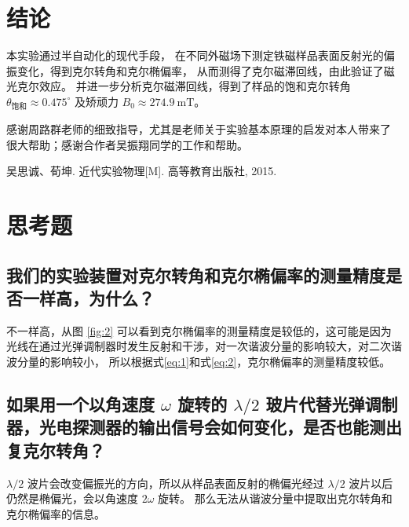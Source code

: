 \documentclass[revtex4-2]{mpltx}
\begin{document}
\section{结论}
    本实验通过半自动化的现代手段，
    在不同外磁场下测定铁磁样品表面反射光的偏振变化，得到克尔转角和克尔椭偏率，
    从而测得了克尔磁滞回线，由此验证了磁光克尔效应。
    并进一步分析克尔磁滞回线，得到了样品的饱和克尔转角 $\theta_{\text{饱和}} \approx 0.475^\circ$ 
    及矫顽力 $B_0 \approx 274.9\ \text{mT}$。
\begin{acknowledgments}
    感谢周路群老师的细致指导，尤其是老师关于实验基本原理的启发对本人带来了
很大帮助；感谢合作者吴振翔同学的工作和帮助。
\end{acknowledgments}
\begin{thebibliography}{99}
     吴思诚、荀坤. 近代实验物理[M]. 高等教育出版社, 2015.
\end{thebibliography}
\clearpage
\appendix
\section{思考题}
\subsection{我们的实验装置对克尔转角和克尔椭偏率的测量精度是否一样高，为什么？}
不一样高，从图 \ref{fig:2} 可以看到克尔椭偏率的测量精度是较低的，这可能是因为
光线在通过光弹调制器时发生反射和干涉，对一次谐波分量的影响较大，对二次谐波分量的影响较小，
所以根据式\eqref{eq:1}和式\eqref{eq:2}，克尔椭偏率的测量精度较低。
\subsection{如果用一个以角速度 $\omega$ 旋转的 $\lambda/2$ 玻片代替光弹调制器，光电探测器的输出信号会如何变化，是否也能测出复克尔转角？}
$\lambda/2$ 波片会改变偏振光的方向，所以从样品表面反射的椭偏光经过
$\lambda/2$ 波片以后仍然是椭偏光，会以角速度 $2\omega$ 旋转。
那么无法从谐波分量中提取出克尔转角和克尔椭偏率的信息。
\end{document}
